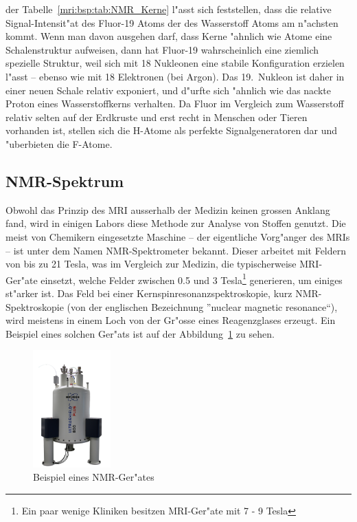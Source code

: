 der Tabelle~\ref{mri:bsp:tab:NMR_Kerne} l"asst sich feststellen,
dass die relative Signal-Intensit"at des Fluor-19 Atoms der des
Wasserstoff Atoms am n"achsten kommt. Wenn man davon ausgehen darf,
dass Kerne "ahnlich wie Atome eine Schalenstruktur aufweisen, dann
hat Fluor-19 wahrscheinlich eine ziemlich spezielle Struktur, weil
sich mit 18 Nukleonen eine stabile Konfiguration erzielen l"asst
-- ebenso wie mit 18 Elektronen (bei Argon). Das 19.~Nukleon ist
daher in einer neuen Schale relativ exponiert, und d"urfte sich
"ahnlich wie das nackte Proton eines Wasserstoffkerns verhalten.
Da Fluor im Vergleich zum Wasserstoff relativ selten auf der Erdkruste
und erst recht in Menschen oder Tieren vorhanden ist, stellen sich
die H-Atome als perfekte Signalgeneratoren dar und "uberbieten die
F-Atome.

\subsection{NMR-Spektrum}
Obwohl das Prinzip des MRI ausserhalb der Medizin keinen grossen
Anklang fand, wird in einigen Labors diese Methode zur Analyse von
Stoffen genutzt. Die meist von Chemikern eingesetzte Maschine --
der eigentliche Vorg"anger des MRIs -- ist unter dem Namen
NMR-Spektrometer bekannt. Dieser arbeitet mit Feldern von bis zu
21 Tesla, was im Vergleich zur Medizin, die typischerweise MRI-Ger"ate
einsetzt, welche Felder zwischen 0.5 und 3 Tesla\footnote{Ein paar
wenige Kliniken besitzen MRI-Ger"ate mit 7 - 9 Tesla} generieren,
um einiges st"arker ist. Das Feld bei einer Kernspinresonanzspektroskopie,
kurz NMR-Spektroskopie (von der englischen Bezeichnung ”nuclear
magnetic resonance“), wird meistens in einem Loch von der Gr"osse
eines Reagenzglases erzeugt. Ein Beispiel eines solchen Ger"ats ist
auf der Abbildung~\ref{mri:bsp:abb:nmr_Beispiel} zu sehen.
\begin{figure}
	\centering
	\includegraphics[width = 3cm]{./mri/pic/NMR.jpg}
	\caption{Beispiel eines NMR-Ger"ates \cite{skript:mri:MaxPlanckCampus}}
	\label{mri:bsp:abb:nmr_Beispiel}
\end{figure}

